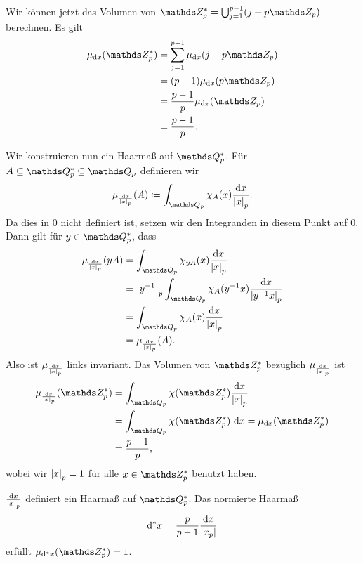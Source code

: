 \begin{bsp}
Wir können jetzt das Volumen von $\Z_p^\ast=\bigcup_{j=1}^{p-1}(j+p\Z_p)$ berechnen.
Es gilt
\begin{align*}
\mu_{\mathrm{d}x}(\Z_p^\ast)&=\sum_{j=1}^{p-1} \mu_{\mathrm{d}x}(j+p\Z_p)\\
&=(p-1)\mu_{\mathrm{d}x}(p \Z_p)\\
&=\frac{p-1}{p}\mu_{\mathrm{d}x}(\Z_p)\\
&=\frac{p-1}{p}.
\end{align*}
\end{bsp}

Wir konstruieren nun ein Haarmaß auf $\Q_p^\ast$.
Für $A \subseteq \Q_p^\ast\subseteq \Q_p$ definieren wir
\begin{align*}
\mu_{\frac{\mathrm{d}x}{\abs{x}_p}}(A)\coloneqq \int_{\Q_p} \chi_A(x)\frac{\mathrm{d}x}{\abs{x}_p}.
\end{align*}
Da dies in $0$ nicht definiert ist, setzen wir den Integranden in diesem Punkt auf $0$.
Dann gilt für $y\in \Q_p^\ast$, dass
\begin{align*}
\mu_{\frac{\mathrm{d}x}{\abs{x}_p}}(yA)&=\int_{\Q_p} \chi_{yA}(x)\frac{\mathrm{d}x}{\abs{x}_p}\\
&=\abs{y^{-1}}_p \int_{\Q_p}\chi_A(y^{-1}x)\frac{\mathrm{d}x}{\abs{y^{-1}x}_p}\\
&=\int_{\Q_p} \chi_A(x)\frac{\mathrm{d}x}{\abs{x}_p}\\
&=\mu_{\frac{\mathrm{d}x}{\abs{x}_p}}(A).
\end{align*}
Also ist $\mu_{\frac{\mathrm{d}x}{\left\vert x\right\vert_p}}$ links invariant.
Das Volumen von $\Z_p^\ast$ bezüglich $\mu_{\frac{\mathrm{d}x}{\left\vert x\right\vert_p}}$ ist
\begin{align*}
\mu_{\frac{\mathrm{d}x}{\abs{x}_p}}(\Z_p^\ast)&=\int_{\Q_p}\chi(\Z_p^\ast) \frac{\mathrm{d}x}{\abs{x}_p}\\
&=\int_{\Q_p}\chi(\Z_p^\ast)~\mathrm{d}x=\mu_{\mathrm{d}x}(\Z_p^\ast)\\
&=\frac{p-1}{p},
\end{align*}
wobei wir $\left\vert x\right\vert_p=1$ für alle $x\in \Z_p^\ast$ benutzt haben.


\begin{thm}
${\frac{\mathrm{d}x}{\left\vert x\right\vert_p}}$ definiert ein Haarmaß auf $\Q_p^\ast$.
Das normierte Haarmaß
\begin{align*}
\mathrm{d}^\ast x =\frac{p}{p-1}{\frac{\mathrm{d}x}{\left\vert x_p\right\vert}}
\end{align*}
erfüllt $\mu_{\mathrm{d}^\ast x}(\Z_p^\ast)=1$.
\end{thm}

